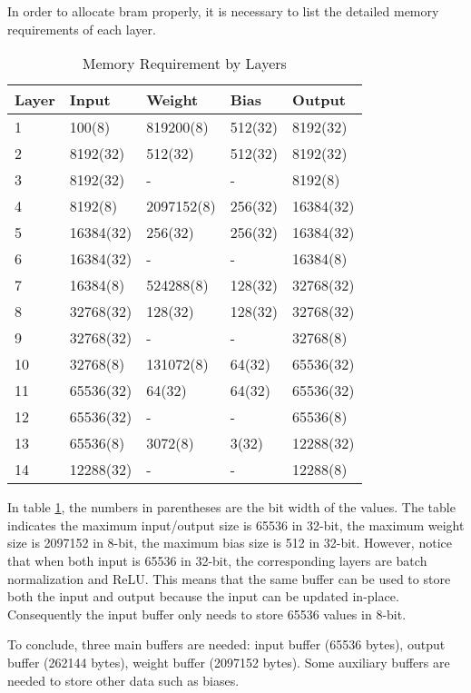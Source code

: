 In order to allocate \gls{bram} properly, it is necessary to list the detailed memory requirements of each
layer.

\begin{table}[h]
  \centering
  \caption{Memory Requirement by Layers}
  \begin{tabular}{l | l | l | l | l}
    \toprule
    Layer & Input & Weight & Bias & Output \\
    \midrule
    1 & 100(8) & 819200(8) & 512(32) & 8192(32) \\
    2 & 8192(32) & 512(32) & 512(32) & 8192(32) \\
    3 & 8192(32) & - & - & 8192(8) \\
    4 & 8192(8) & 2097152(8) & 256(32) & 16384(32) \\
    5 & 16384(32) & 256(32) & 256(32) & 16384(32) \\
    6 & 16384(32) & - & - & 16384(8) \\
    7 & 16384(8) & 524288(8) & 128(32) & 32768(32) \\
    8 & 32768(32) & 128(32) & 128(32) & 32768(32) \\
    9 & 32768(32) & - & - & 32768(8) \\
    10 & 32768(8) & 131072(8) & 64(32) & 65536(32) \\
    11 & 65536(32) & 64(32) & 64(32) & 65536(32) \\
    12 & 65536(32) & - & - & 65536(8) \\
    13 & 65536(8) & 3072(8) & 3(32) & 12288(32) \\
    14 & 12288(32) & - & - & 12288(8) \\
    \bottomrule
  \end{tabular}
  \label{table:memory_requirements}
\end{table}

In table \ref{table:memory_requirements}, the numbers in parentheses are the bit width of the values. The table
indicates the maximum input/output size is 65536 in 32-bit, the maximum weight size is 2097152 in 8-bit, the
maximum bias size is 512 in 32-bit. However, notice that when both input is 65536 in 32-bit, the corresponding
layers are batch normalization and ReLU. This means that the same buffer can be used to store both the
input and output because the input can be updated in-place. Consequently the input buffer only needs to
store 65536 values in 8-bit.

To conclude, three main buffers are needed: input buffer (65536 bytes), output buffer (262144 bytes),
weight buffer (2097152 bytes). Some auxiliary buffers are needed to store other data such as biases.

